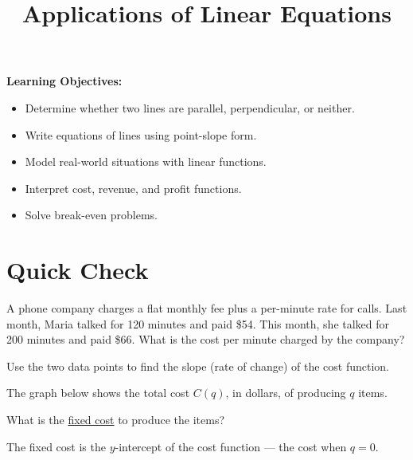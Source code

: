 \documentclass{ximera}
\title{Applications of Linear Equations}
\begin{document}
\begin{abstract}
\end{abstract}
\maketitle

\textbf{Learning Objectives:}
\begin{itemize}
  \item Determine whether two lines are parallel, perpendicular, or neither.
  \item Write equations of lines using point-slope form.
  \item Model real-world situations with linear functions.
  \item Interpret cost, revenue, and profit functions.
  \item Solve break-even problems.
\end{itemize}
\medskip

\section*{Quick Check}

\begin{problem}
A phone company charges a flat monthly fee plus a per-minute rate for calls. Last month, Maria talked for 120 minutes and paid \$54. This month, she talked for 200 minutes and paid \$66. What is the cost per minute charged by the company?
\begin{hint}
Use the two data points to find the slope (rate of change) of the cost function.
\end{hint}
\begin{multipleChoice}
\end{multipleChoice}
\end{problem}

\begin{problem}
The graph below shows the total cost $C(q)$, in dollars, of producing $q$ items.

\begin{center}
\end{center}

What is the \underline{fixed cost} to produce the items?
\begin{hint}
The fixed cost is the $y$-intercept of the cost function --- the cost when $q = 0$.
\end{hint}
\begin{multipleChoice}
\end{multipleChoice}
\end{problem}
\end{document}
